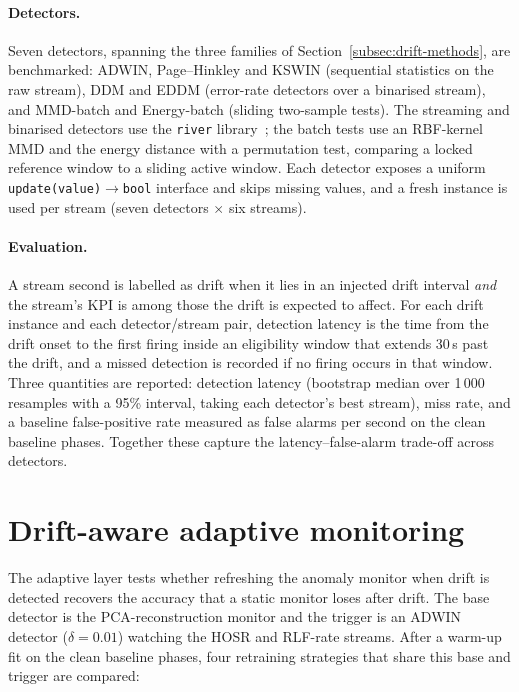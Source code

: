 \paragraph{Detectors.}
Seven detectors, spanning the three families of
Section~\ref{subsec:drift-methods}, are benchmarked: ADWIN, Page--Hinkley and
KSWIN (sequential statistics on the raw stream), DDM and EDDM (error-rate
detectors over a binarised stream), and MMD-batch and Energy-batch (sliding
two-sample tests). The streaming and binarised detectors use the
\texttt{river} library~\cite{montiel2021river}; the batch tests use an RBF-kernel
MMD and the energy distance with a permutation test, comparing a locked
reference window to a sliding active window. Each detector exposes a uniform
\texttt{update(value)$\rightarrow$bool} interface and skips missing values, and a
fresh instance is used per stream (seven detectors $\times$ six streams).

\paragraph{Evaluation.}
A stream second is labelled as drift when it lies in an injected drift interval
\emph{and} the stream's KPI is among those the drift is expected to affect. For
each drift instance and each detector/stream pair, detection latency is the time
from the drift onset to the first firing inside an eligibility window that
extends 30\,s past the drift, and a missed detection is recorded if no firing
occurs in that window. Three quantities are reported: detection latency
(bootstrap median over 1\,000 resamples with a 95\% interval, taking each
detector's best stream), miss rate, and a baseline false-positive rate measured
as false alarms per second on the clean baseline phases. Together these capture
the latency--false-alarm trade-off across detectors.

\section{Drift-aware adaptive monitoring}
\label{sec:adaptive-method}

The adaptive layer tests whether refreshing the anomaly monitor when drift is
detected recovers the accuracy that a static monitor loses after drift. The base
detector is the PCA-reconstruction monitor and the trigger is an ADWIN detector
($\delta=0.01$) watching the HOSR and RLF-rate streams. After a warm-up fit on
the clean baseline phases, four retraining strategies that share this base and
trigger are compared:

